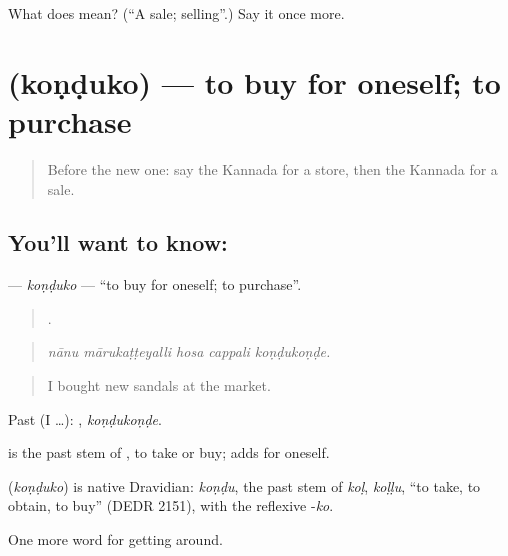 \begin{tcolorbox}[breakable,colback=teal!4,colframe=teal!35!black,title={Before you move on}]
What does  mean? (\textquotedblleft{}A sale; selling\textquotedblright{}.) Say it once more.
\end{tcolorbox}
\section[\texorpdfstring{\kn{ಕೊಂಡುಕೊ} (koṇḍuko)}{ಕೊಂಡುಕೊ (koṇḍuko)}]{ (koṇḍuko) — to buy for oneself; to purchase}

\label{lesson:KA-C467-konduko}



\begin{quote}
Before the new one: say the Kannada for a store, then the Kannada for a sale.
\end{quote}

\subsection*{You'll want to know: }
\textbf{} — \emph{koṇḍuko} — \textquotedblleft{}to buy for oneself; to purchase\textquotedblright{}.

\begin{quote}
    .
\end{quote}

\begin{quote}
\emph{nānu mārukaṭṭeyalli hosa cappali koṇḍukoṇḍe.}
\end{quote}

\begin{quote}
I bought new sandals at the market.
\end{quote}

Past (I …): , \emph{koṇḍukoṇḍe}.

 is the past stem of , to take or buy;  adds for oneself.

\begin{cousinweb}
\textbf{} (\emph{koṇḍuko}) is native Dravidian: \emph{koṇḍu}, the past stem of \emph{koḷ}, \emph{koḷḷu}, \textquotedblleft{}to take, to obtain, to buy\textquotedblright{} (DEDR 2151), with the reflexive -\emph{ko}.
\end{cousinweb}

\begin{grammarlens}[title={What you've built}]
One more word for getting around.
\end{grammarlens}

